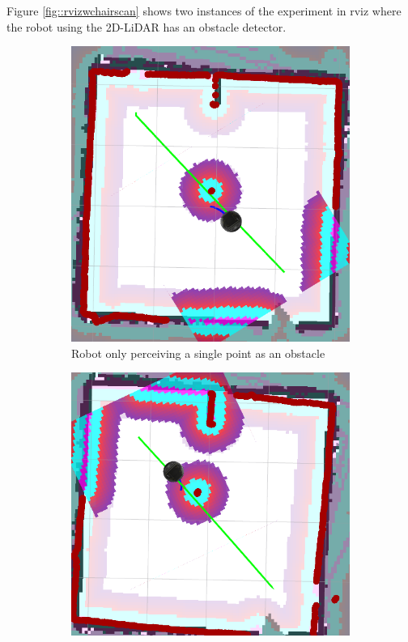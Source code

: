 Figure \ref{fig::rvizwchairscan} shows two instances of the experiment in rviz where the robot using the 2D-\ac{LiDAR} has an obstacle detector.
\begin{figure}[ht!]
  \centering
  \begin{subfigure}[t]{0.44\linewidth}
    \includegraphics[width=\linewidth]{imgs/chapter5/rvizwchairscan1.png}
     \caption{Robot only perceiving a single point as an obstacle}
     \label{fig::rvizwchairscan1}
  \end{subfigure}
  \begin{subfigure}[t]{0.49\linewidth}
    \includegraphics[width=\linewidth]{imgs/chapter5/rvizwchairscan2.png}

\end{subfigure}
\end{figure}
